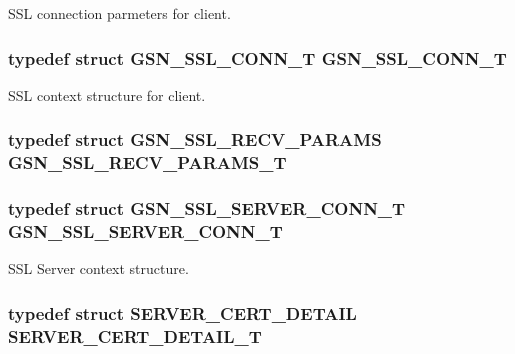 SSL connection parmeters for client. 

\hypertarget{a00590_a6cfb78a2ffc706dcf264400a3f3bcbcc}{
\subsubsection[{GSN\_\-SSL\_\-CONN\_\-T}]{\setlength{\rightskip}{0pt plus 5cm}typedef struct {\bf GSN\_\-SSL\_\-CONN\_\-T} {\bf GSN\_\-SSL\_\-CONN\_\-T}}}
\label{a00590_a6cfb78a2ffc706dcf264400a3f3bcbcc}


SSL context structure for client. 

\hypertarget{a00590_a1e6a9615d8936cfd33de0c31c8fb05a5}{
\subsubsection[{GSN\_\-SSL\_\-RECV\_\-PARAMS\_\-T}]{\setlength{\rightskip}{0pt plus 5cm}typedef struct {\bf GSN\_\-SSL\_\-RECV\_\-PARAMS} {\bf GSN\_\-SSL\_\-RECV\_\-PARAMS\_\-T}}}
\label{a00590_a1e6a9615d8936cfd33de0c31c8fb05a5}
\hypertarget{a00590_a332d8f9cc0e8ad1eb424089450db11a8}{
\subsubsection[{GSN\_\-SSL\_\-SERVER\_\-CONN\_\-T}]{\setlength{\rightskip}{0pt plus 5cm}typedef struct {\bf GSN\_\-SSL\_\-SERVER\_\-CONN\_\-T} {\bf GSN\_\-SSL\_\-SERVER\_\-CONN\_\-T}}}
\label{a00590_a332d8f9cc0e8ad1eb424089450db11a8}


SSL Server context structure. 

\hypertarget{a00590_a97fb9dc92ed454d9d7e3f3e18bd57264}{
\subsubsection[{SERVER\_\-CERT\_\-DETAIL\_\-T}]{\setlength{\rightskip}{0pt plus 5cm}typedef struct {\bf SERVER\_\-CERT\_\-DETAIL} {\bf SERVER\_\-CERT\_\-DETAIL\_\-T}}}
\label{a00590_a97fb9dc92ed454d9d7e3f3e18bd57264}


